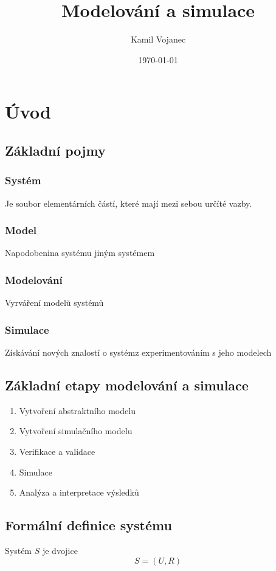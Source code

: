 \documentclass[11pt]{article}
\author{Kamil Vojanec}
\date{\today}
\title{Modelování a simulace}
\begin{document}
\maketitle
\tableofcontents

\section{Úvod}
\label{sec:orgd762b9f}
\subsection{Základní pojmy}
\label{sec:orga5ed381}
\subsubsection{Systém}
\label{sec:org2d91471}
Je soubor elementárních částí, které mají mezi sebou určíté vazby.
\subsubsection{Model}
\label{sec:org8a16c2f}
Napodobenina systému jiným systémem
\subsubsection{Modelování}
\label{sec:orgb8768c7}
Vyrváření modelů systémů
\subsubsection{Simulace}
\label{sec:org17d9fc4}
Získávání nových znalostí o systémz experimentováním s jeho modelech

\subsection{Základní etapy modelování a simulace}
\label{sec:org60746fe}
\begin{enumerate}
\item Vytvoření abstraktního modelu
\item Vytvoření simulačního modelu
\item Verifikace a validace
\item Simulace
\item Analýza a interpretace výsledků
\end{enumerate}

\subsection{Formální definice systému}
\label{sec:orgc78cdb8}
Systém \(S\) je dvojice
\[S = (U, R)\]
\end{document}
